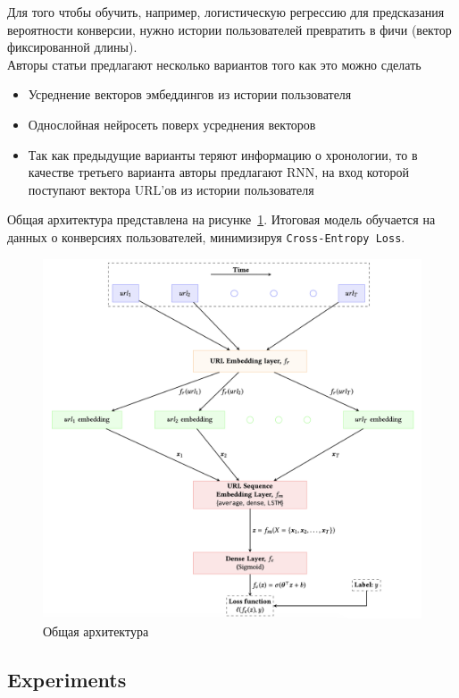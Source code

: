 Для того чтобы обучить, например, логистическую регрессию для предсказания вероятности конверсии, нужно истории пользователей превратить в фичи (вектор фиксированной длины). \\

Авторы статьи предлагают несколько вариантов того как это можно сделать
\begin{itemize}
    \item Усреднение векторов эмбеддингов из истории пользователя
    \item Однослойная нейросеть поверх усреднения векторов
    \item Так как предыдущие варианты теряют информацию о хронологии, то в качестве третьего варианта авторы предлагают RNN, на вход которой поступают вектора URL'ов из истории пользователя
\end{itemize}

Общая архитектура представлена на рисунке~\ref{fig:predicting_conversion}. Итоговая модель обучается на данных о конверсиях пользователей, минимизируя \texttt{Cross-Entropy Loss}.

\begin{figure}[ht]
    \centering
    \includegraphics[width=0.8\linewidth]{images/predicting_conversions.png}
    \caption{Общая архитектура}
    \label{fig:predicting_conversion}
\end{figure}

\subsection*{Experiments}

